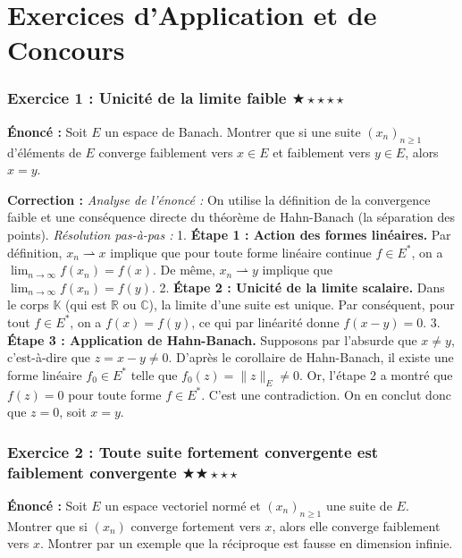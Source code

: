 \documentclass[11pt,a4paper]{article}
\begin{document}
\newpage
\part{Exercices d'Application et de Concours}

\section{Exercice 1 : Unicité de la limite faible \quad $\bigstar\star\star\star\star$}

\textbf{Énoncé :}
Soit $E$ un espace de Banach. Montrer que si une suite $(x_n)_{n \ge 1}$ d'éléments de $E$ converge faiblement vers $x \in E$ et faiblement vers $y \in E$, alors $x = y$.

\textbf{Correction :}
\textit{Analyse de l'énoncé :} On utilise la définition de la convergence faible et une conséquence directe du théorème de Hahn-Banach (la séparation des points).
\textit{Résolution pas-à-pas :}
1. \textbf{Étape 1 : Action des formes linéaires.}
   Par définition, $x_n \rightharpoonup x$ implique que pour toute forme linéaire continue $f \in E^*$, on a $\lim_{n \to \infty} f(x_n) = f(x)$.
   De même, $x_n \rightharpoonup y$ implique que $\lim_{n \to \infty} f(x_n) = f(y)$.
2. \textbf{Étape 2 : Unicité de la limite scalaire.}
   Dans le corps $\mathbb{K}$ (qui est $\mathbb{R}$ ou $\mathbb{C}$), la limite d'une suite est unique.
   Par conséquent, pour tout $f \in E^*$, on a $f(x) = f(y)$, ce qui par linéarité donne $f(x - y) = 0$.
3. \textbf{Étape 3 : Application de Hahn-Banach.}
   Supposons par l'absurde que $x \neq y$, c'est-à-dire que $z = x - y \neq 0$.
   D'après le corollaire de Hahn-Banach, il existe une forme linéaire $f_0 \in E^*$ telle que $f_0(z) = \|z\|_E \neq 0$.
   Or, l'étape 2 a montré que $f(z) = 0$ pour toute forme $f \in E^*$.
   C'est une contradiction. On en conclut donc que $z = 0$, soit $x = y$.


\section{Exercice 2 : Toute suite fortement convergente est faiblement convergente \quad $\bigstar\bigstar\star\star\star$}

\textbf{Énoncé :}
Soit $E$ un espace vectoriel normé et $(x_n)_{n \ge 1}$ une suite de $E$. Montrer que si $(x_n)$ converge fortement vers $x$, alors elle converge faiblement vers $x$. Montrer par un exemple que la réciproque est fausse en dimension infinie.
\end{document}
